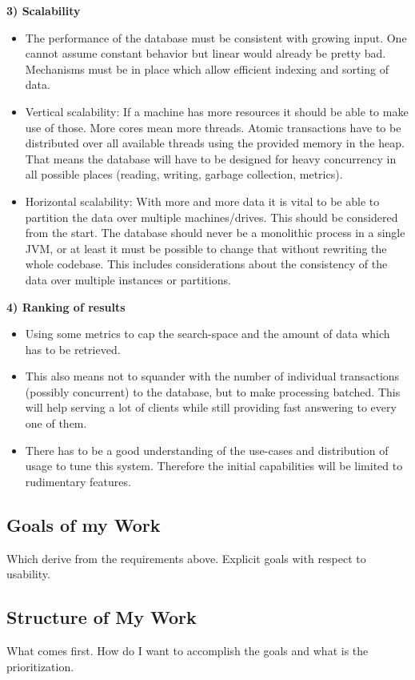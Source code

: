\documentclass[twoside, 11pt]{scrartcl}
\begin{document}
\textbf{3) Scalability}
\begin{itemize}
	\item The performance of the database must be consistent with growing input. One cannot assume constant behavior but linear would already be pretty bad. Mechanisms must be in place which allow efficient indexing and sorting of data.	
	\item Vertical scalability: If a machine has more resources it should be able to make use of those. More cores mean more threads. Atomic transactions have to be distributed over all available threads using the  provided memory in the heap. That means the database will have to be designed for heavy concurrency in all possible places (reading, writing, garbage collection, metrics).
	\item Horizontal scalability: With more and more data it is vital to be able to partition the data over multiple machines/drives. This should be considered from the start. The database should never be a monolithic process in a single JVM, or at least it must be possible to change that without rewriting the whole codebase. This includes considerations about the consistency of the data over multiple instances or partitions.
\end{itemize}

\textbf{4) Ranking of results} \\
\begin{itemize}
	\item Using some metrics to cap the search-space and the amount of data which has to be retrieved.
	\item This also means not to squander with the number of individual transactions (possibly concurrent) to the database, but to make processing batched. This will help serving a lot of clients while still providing fast answering to every one of them.
	\item There has to be a good understanding of the use-cases and distribution of usage to tune this system. Therefore the initial capabilities will be limited to rudimentary features.
\end{itemize}
  

\subsection{Goals of my Work}
Which derive from the requirements above. Explicit goals with respect to usability.


\subsection{Structure of My Work}
What comes first. How do I want to accomplish the goals and what is the prioritization.
\end{document}
